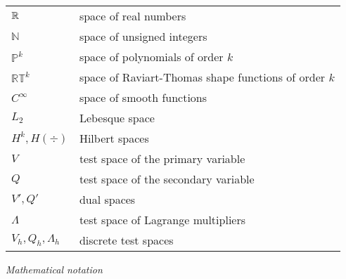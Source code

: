 \begin{tabularx}{0.9\linewidth}{@{}lX@{}}
$\mathbb{R}$ & space of real numbers  \\
$\mathbb N$ & space of unsigned integers \\
$\mathbb P^k$ & space of polynomials of order $k$  \\
$\mathbb {RT}^k$ & space of Raviart-Thomas shape functions of order $k$  \\
$C^{\infty}$ & space of smooth functions  \\
$L_2$ & Lebesque space \\
$H^k, H(\div)$ & Hilbert spaces \\
$V$ & test space of the primary variable \\
$Q$ & test space of the secondary variable \\
$V', Q'$ & dual spaces \\
$\Lambda$ & test space of Lagrange multipliers\\
$V_h, Q_h, \Lambda_h$ & discrete test spaces
\end{tabularx}
\pagebreak

\noindent\emph{Mathematical notation}
\vspace{0.5cm}

